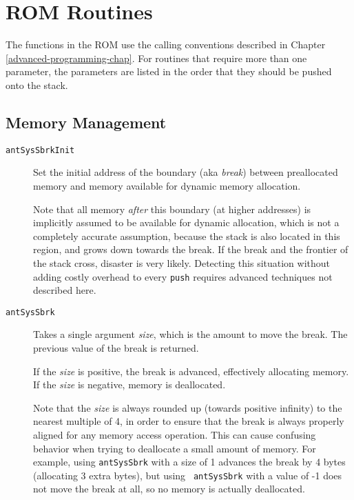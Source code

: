 \section{ROM Routines}

The functions in the ROM use the calling conventions described in
Chapter \ref{advanced-programming-chap}.  For routines that require
more than one parameter, the parameters are listed in the order that
they should be pushed onto the stack.

\subsection{Memory Management}

\begin{description}

\item[{\tt antSysSbrkInit}]

	Set the initial address of the boundary (aka {\em break})
	between preallocated memory and memory available for dynamic
	memory allocation.

	Note that all memory {\em after} this boundary (at higher
	addresses) is implicitly assumed to be available for dynamic
	allocation, which is not a completely accurate assumption,
	because the stack is also located in this region, and grows
	down towards the break.  If the break and the frontier of the
	stack cross, disaster is very likely.  Detecting this
	situation without adding costly overhead to every {\tt push}
	requires advanced techniques not described here.

\item[{\tt antSysSbrk}]

	Takes a single argument {\em size}, which is the amount to
	move the break.  The previous value of the break is returned.

	If the {\em size} is positive, the break is advanced,
	effectively allocating memory.  If the {\em size} is negative,
	memory is deallocated.

	Note that the {\em size} is always rounded up (towards
	positive infinity) to the nearest multiple of 4, in order to
	ensure that the break is always properly aligned for any
	memory access operation.  This can cause confusing behavior
	when trying to deallocate a small amount of memory.  For
	example, using {\tt antSysSbrk} with a size of 1 advances the
	break by 4 bytes (allocating 3 extra bytes), but using {\tt
	antSysSbrk} with a value of -1 does not move the break at all,
	so no memory is actually deallocated. 

\end{description}

